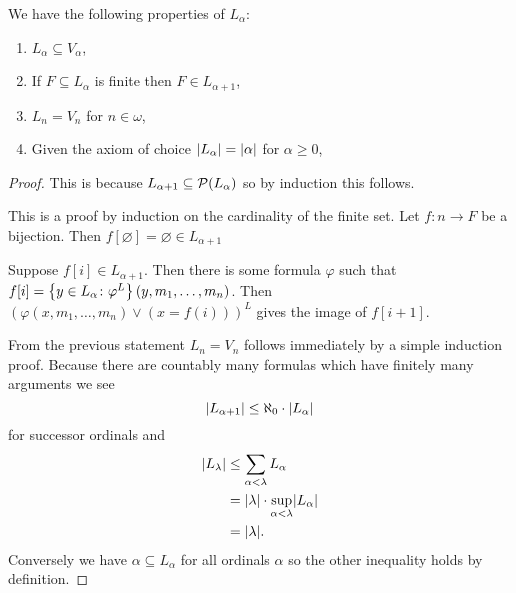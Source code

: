 \begin{proposition}
    We have the following properties of \(L_{\alpha}\):
    \begin{enumerate}
        \item \(L_{\alpha}\subseteq V_{\alpha}\),
        \item If \(F\subseteq L_{\alpha}\) is finite then \(F\in L_{\alpha+1}\),
        \item \(L_{n}=V_{n}\) for \(n\in\omega\),
        \item Given the axiom of choice \(\lvert L_{\alpha}\rvert=\lvert\alpha\rvert\) for
              \(\alpha\geq 0\),
    \end{enumerate}

    \begin{proof}
        This is because \(L_{\alpha+1}\subseteq\mathcal{P}(L_{\alpha})\) so by
        induction this follows.

        This is a proof by induction on the cardinality of the finite set. Let
        \(f:n\to F\) be a bijection. Then \(f[\varnothing]=\varnothing\in
        L_{\alpha+1}\)

        Suppose \(f[i]\in L_{\alpha+1}\). Then there is some formula \(\varphi\)
        such that \(f[i]=\left\{y\in
            L_{\alpha}\colon\varphi^{L}\right\}(y,m_{1},\ldots,m_{n})\). Then
        \((\varphi(x,m_{1},\ldots,m_{n})\vee(x=f(i)))^{L}\) gives the image
        of \(f[i+1]\).

        From the previous statement \(L_{n}=V_{n}\) follows immediately by a
        simple induction proof. Because there are countably many formulas which
        have finitely many arguments we see
        \[
            \lvert L_{\alpha+1}\rvert\leq\aleph_{0}\cdot \lvert L_{\alpha}\rvert
        \]
        for successor ordinals and
        \begin{align*}
            \lvert L_{\lambda}\rvert & \leq\sum_{\alpha<\lambda}L_{\alpha}                      \\
                              & =\lvert\lambda\rvert\cdot\sup_{\alpha<\lambda}\lvert L_{\alpha}\rvert \\
                              & =\lvert\lambda\rvert.
        \end{align*}
        Conversely we have \(\alpha\subseteq L_{\alpha}\) for all ordinals
        \(\alpha\) so the other inequality holds by definition.
    \end{proof}
\end{proposition}

